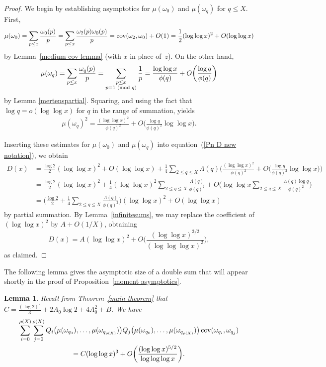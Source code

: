 \documentclass[12pt,reqno]{amsart}
\newtheorem{lemma}[theorem]{Lemma}
\theoremstyle{definition}
\renewcommand{\mod}[1]{{\ifmmode\text{\rm\ (mod~$#1$)}\else\discretionary{}{}{\hbox{ }}\rm(mod~$#1$)\fi}}
\newcommand{\cov}{\mathop{\rm cov}\nolimits}
\begin{document}
\begin{proof}
We begin by establishing asymptotics for $\mu(\omega_0)$ and $\mu(\omega_q)$ for $q \leq X$. First,
\[
\mu(\omega_0) = \sum_{p \leq x} \frac{\omega_0(p)}{p} = \sum_{p \leq x} \frac{\omega_2(p)\omega_0(p)}{p} = \cov(\omega_2,\omega_0)+O(1) = \frac{1}{2}(\log\log x)^2 + O(\log\log x)
\]
by Lemma~\ref{medium cov lemma} (with $x$ in place of~$z$). On the other hand,
\begin{align}\label{muomegaq}
\mu(\omega_q) = \sum_{p \leq x} \frac{\omega_q(p)}{p} = \sum_{\substack{p \leq x \\ p\equiv1\mod q}} \frac{1}{p} = \frac{\log\log x}{\phi(q)} + O\bigg( \frac{\log q}{\phi(q)} \bigg)
\end{align}
by Lemma \ref{mertenspartial}. Squaring, and using the fact that $\log q = o(\log\log x)$ for $q$ in the range of summation, yields
\begin{align*} %
\mu(\omega_q)^2 = \frac{(\log\log x)^2}{\phi(q)^2} + O\bigg(\frac{\log q}{\phi(q)^2} \log\log x \bigg).
\end{align*}

Inserting these estimates for $\mu(\omega_0)$ and $\mu(\omega_q)$ into equation~(\ref{Pn D new notation}), we obtain
\begin{align*}
D(x) &= \frac{\log 2}{2} (\log\log x)^2 + O(\log\log x) + \frac{1}{4} \sum_{2\le q \leq X} \Lambda(q) \bigg( \frac{(\log\log x)^2}{\phi(q)^2} + O\bigg(\frac{\log q}{\phi(q)^2} \log\log x \bigg) \bigg) \\
&= \frac{\log 2}{2} (\log\log x)^2 + \frac{1}{4}(\log\log x)^2 \sum_{2\le q \leq X} \frac{\Lambda(q)}{\phi(q)^2} + O\bigg(\log\log x \sum_{2\le q \leq X} \frac{\Lambda(q) \log q}{\phi(q)^2} \bigg) \\
&= \bigg( \frac{\log 2}{2} + \frac{1}{4}\sum_{2\le q \leq X} \frac{\Lambda(q)}{\phi(q)^2} \bigg) (\log\log x)^2 + O(\log\log x)
\end{align*}
by partial summation.
By Lemma~\ref{infinitesums}, we may replace the coefficient of $(\log\log x)^2$ by $A + O(1/X)$, obtaining
\[
D(x) = A(\log\log x)^2 + O\bigg(\frac{(\log\log x)^{3/2}}{(\log\log\log x)^2} \bigg),
\]
as claimed.
\end{proof}

The following lemma gives the asymptotic size of a double sum that will appear shortly in the proof of Proposition~\ref{moment asymptotics}.

\begin{lemma}\label{OOM of sum of partial derivs}
Recall from Theorem~\ref{main theorem} that $C = \frac{(\log 2)^2}{3} + 2 A_0 \log 2 + 4A_0^2 + B$. We have
\begin{multline}  \label{secondmoment}
\sum_{i=0}^{\rho(X)} \sum_{j=0}^{\rho(X)} Q_i \big( \mu(\omega_{q_0}),\dots,\mu(\omega_{q_{\rho(X)}}) \big) Q_j\big( \mu(\omega_{q_0}),\dots,\mu(\omega_{q_{\rho(X)}}) \big) \cov(\omega_{q_i},\omega_{q_j}) \\
= C (\log\log x)^3 + O\bigg(\frac{(\log\log x)^{5/2}}{\log\log\log x}\bigg).
\end{multline} 
\end{lemma}
\end{document}
